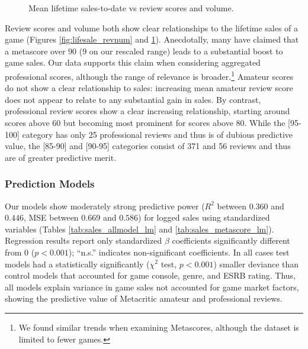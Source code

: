 \documentclass{sig-alternate}
\begin{document}
\begin{figure}[tb]
\begin{subfigure}[b]{\linewidth}
\label{fig:lifesale_revscore}
\end{subfigure}

\caption{Mean lifetime sales-to-date vs review scores and volume.}
\label{fig:lifesale_plots}
\end{figure}


Review scores and volume both show clear relationships to the lifetime sales of a game (Figures \ref{fig:lifesale_revnum} and \ref{fig:lifesale_revscore}). Anecdotally, many have claimed that a metascore over 90 (9 on our rescaled range) leads to a substantial boost to game sales. Our data supports this claim when considering aggregated professional scores, although the range of relevance is broader.\footnote{We found similar trends when examining Metascores, although the dataset is limited to fewer games.} Amateur scores do not show a clear relationship to sales: increasing mean amateur review score does not appear to relate to any substantial gain in sales. By contrast, professional review scores show a clear increasing relationship, starting around scores above 60 but becoming most prominent for scores above 80. While the [95-100] category has only 25 professional reviews and thus is of dubious predictive value, the [85-90] and [90-95] categories consist of 371 and 56 reviews and thus are of greater predictive merit.

\pagebreak

\subsubsection{Prediction Models}
Our models show moderately strong predictive power ($R^2$ between $0.360$ and $0.446$, MSE between $0.669$ and $0.586$) for logged sales using standardized variables (Tables \ref{tab:sales_allmodel_lm} and \ref{tab:sales_metascore_lm}). Regression results report only standardized $\beta$ coefficients significantly different from 0 ($p < 0.001$); ``n.s.'' indicates non-significant coefficients. In all cases test models had a statistically significantly ($\chi^2$ test, $p < 0.001$) smaller deviance than control models that accounted for game console, genre, and ESRB rating. Thus, all models explain variance in game sales not accounted for game market factors, showing the predictive value of Metacritic amateur and professional reviews.
\end{document}
